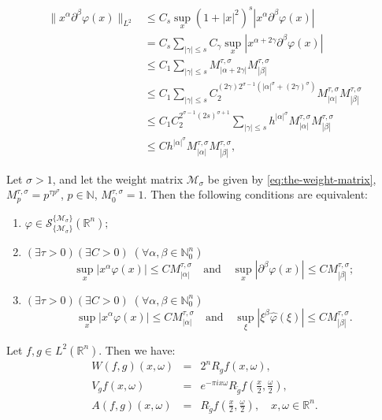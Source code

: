 \documentclass[10pt,a4paper]{amsart}
\begin{document}
\begin{align}
\| x^{\alpha } \partial ^{\beta }  \varphi(x)\|_{L^2} 
& \leq C_s  \sup_{x} (1+|x|^2)^{s} |x^\alpha \partial^\beta \varphi(x)| \nonumber \\
& = C_s  \sum_{|\gamma| \leq s} 
C_\gamma  \sup_{x} | x^{\alpha + 2\gamma} \partial^\beta \varphi(x)| 
\nonumber \\
& \leq C_1  \sum_{|\gamma| \leq s} 
 M^{\tau,\sigma}_{|\alpha + 2\gamma|}   M^{\tau,\sigma}_{|\beta|} \nonumber \\
& \leq C_1  \sum_{|\gamma| \leq s} C_2 ^{(2\gamma) 2^{\sigma - 1}(|\alpha |^\sigma + (2\gamma) ^\sigma)}
M^{\tau,\sigma}_{|\alpha |}   M^{\tau,\sigma}_{|\beta|} 
\nonumber \\
& \leq C_1  C_2 ^{ 2^{\sigma - 1}(2s) ^{\sigma+1}}
\sum_{|\gamma| \leq s} h^{|\alpha |^\sigma }
M^{\tau,\sigma}_{|\alpha |}   M^{\tau,\sigma}_{|\beta|}  
\nonumber \\
& \leq C
h^{|\alpha |^\sigma }
M^{\tau,\sigma}_{|\alpha |}   M^{\tau,\sigma}_{|\beta|},
\label{eq:Linfty-implies-L2}
\end{align}

\begin{Theorem} \label{Thm:opisFurije}
Let $\sigma>1$,  and let the weight matrix $\mathcal{M}_\sigma$ be given by \eqref{eq:the-weight-matrix}, 
$ M_{p}^{\tau,\sigma}=p^{\tau p^\sigma}$, $ p\in \mathbb{N}$, $ M_0^{\tau,\sigma}=1$.
Then the following conditions are equivalent:
    \begin{enumerate}
        \item $\varphi\in \mathcal  S_{\{\mathcal{M}_\sigma\}}^{\{\mathcal{M}_\sigma\}} (\mathbb R^n);$
        \item $(\exists \tau>0)(\exists C>0)\;(\forall \alpha,\beta\in \mathbb N_0^n)$
        $$\sup_x|x^\alpha \varphi(x)|\leq C M^{\tau,\sigma}_{|\alpha|} \quad \text{and}\quad \sup_x|\partial^\beta \varphi(x)|\leq CM^{\tau,\sigma}_{|\beta|};$$
        \item $(\exists \tau>0)(\exists C>0)\;(\forall \alpha,\beta\in \mathbb N_0^n)$
        $$\sup_x|x^\alpha \varphi(x)|\leq C M^{\tau,\sigma}_{|\alpha|} \quad \text{and}\quad \sup_\xi|\xi^\beta \widehat\varphi(\xi)|\leq CM^{\tau,\sigma}_{|\beta|}.$$
    \end{enumerate}
\end{Theorem}

\begin{Lemma} \label{GRandRelatives}
Let  $f, g \in L^2 (\mathbb{R}^n).$ Then we have:
\begin{eqnarray*}
W(f,g) (x,\omega)  & = & 2^n R_g f (x,\omega), \\
V_g f (x,\omega) & = &  e^{-\pi i x \omega} R_{\check{g}} f \left(\frac{x}{2},\frac{\omega}{2}\right),
\\
A(f,g) (x,\omega) & = & R_{\check{g}} f \left(\frac{x}{2},\frac{\omega}{2}\right), \quad
x,\omega \in \mathbb{R}^n.
\end{eqnarray*}
\end{Lemma}
\end{document}

